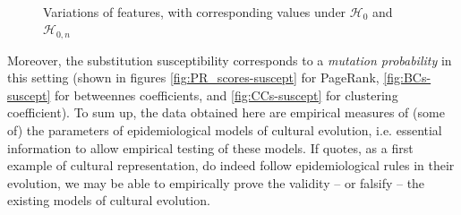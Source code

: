 

\begin{figure}[!th]
	\centering
	~
	~
	\caption{Variations of features, with corresponding values under $\mathcal{H}_0$ and $\mathcal{H}_{0,n}$}
\end{figure}


Moreover, the substitution susceptibility corresponds to a \emph{mutation probability} in this setting (shown in figures \ref{fig:PR_scores-suscept} for PageRank, \ref{fig:BCs-suscept} for betweennes coefficients, and \ref{fig:CCs-suscept} for clustering coefficient). To sum up, the data obtained here are empirical measures of (some of) the parameters of epidemiological models of cultural evolution, i.e. essential information to allow empirical testing of these models. If quotes, as a first example of cultural representation, do indeed follow epidemiological rules in their evolution, we may be able to empirically prove the validity -- or falsify -- the existing models of cultural evolution.

